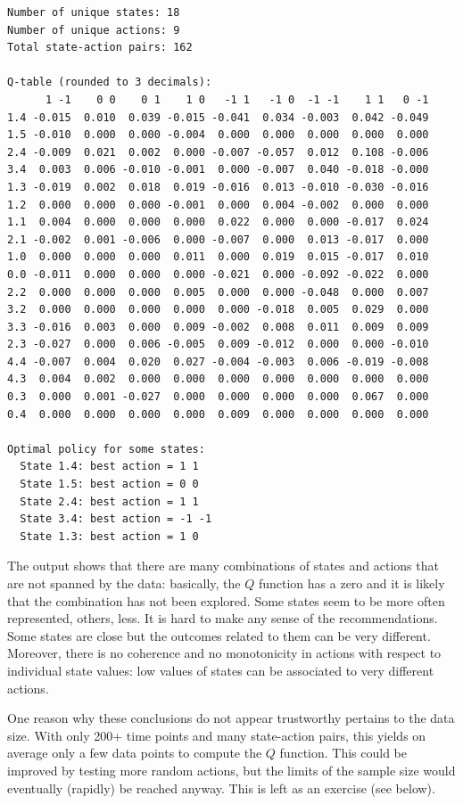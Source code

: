 \begin{verbatim}
Number of unique states: 18
Number of unique actions: 9
Total state-action pairs: 162

Q-table (rounded to 3 decimals):
      1 -1    0 0    0 1    1 0   -1 1   -1 0  -1 -1    1 1   0 -1
1.4 -0.015  0.010  0.039 -0.015 -0.041  0.034 -0.003  0.042 -0.049
1.5 -0.010  0.000  0.000 -0.004  0.000  0.000  0.000  0.000  0.000
2.4 -0.009  0.021  0.002  0.000 -0.007 -0.057  0.012  0.108 -0.006
3.4  0.003  0.006 -0.010 -0.001  0.000 -0.007  0.040 -0.018 -0.000
1.3 -0.019  0.002  0.018  0.019 -0.016  0.013 -0.010 -0.030 -0.016
1.2  0.000  0.000  0.000 -0.001  0.000  0.004 -0.002  0.000  0.000
1.1  0.004  0.000  0.000  0.000  0.022  0.000  0.000 -0.017  0.024
2.1 -0.002  0.001 -0.006  0.000 -0.007  0.000  0.013 -0.017  0.000
1.0  0.000  0.000  0.000  0.011  0.000  0.019  0.015 -0.017  0.010
0.0 -0.011  0.000  0.000  0.000 -0.021  0.000 -0.092 -0.022  0.000
2.2  0.000  0.000  0.000  0.005  0.000  0.000 -0.048  0.000  0.007
3.2  0.000  0.000  0.000  0.000  0.000 -0.018  0.005  0.029  0.000
3.3 -0.016  0.003  0.000  0.009 -0.002  0.008  0.011  0.009  0.009
2.3 -0.027  0.000  0.006 -0.005  0.009 -0.012  0.000  0.000 -0.010
4.4 -0.007  0.004  0.020  0.027 -0.004 -0.003  0.006 -0.019 -0.008
4.3  0.004  0.002  0.000  0.000  0.000  0.000  0.000  0.000  0.000
0.3  0.000  0.001 -0.027  0.000  0.000  0.000  0.000  0.067  0.000
0.4  0.000  0.000  0.000  0.000  0.009  0.000  0.000  0.000  0.000

Optimal policy for some states:
  State 1.4: best action = 1 1
  State 1.5: best action = 0 0
  State 2.4: best action = 1 1
  State 3.4: best action = -1 -1
  State 1.3: best action = 1 0
\end{verbatim}

The output shows that there are many combinations of states and actions that are not spanned by the data: basically, the $Q$ function has a zero and it is likely that the combination has not been explored. Some states seem to be more often represented, others, less. It is hard to make any sense of the recommendations. Some states are close but the outcomes related to them can be very different. Moreover, there is no coherence and no monotonicity in actions with respect to individual state values: low values of states can be associated to very different actions.

One reason why these conclusions do not appear trustworthy pertains to the data size. With only 200+ time points and many state-action pairs, this yields on average only a few data points to compute the $Q$ function. This could be improved by testing more random actions, but the limits of the sample size would eventually (rapidly) be reached anyway. This is left as an exercise (see below).

